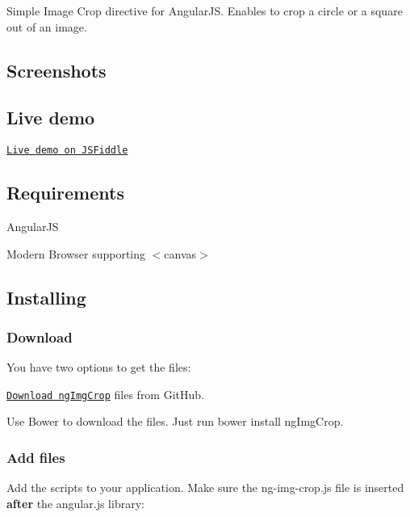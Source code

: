 Simple Image Crop directive for Angular\+JS. Enables to crop a circle or a square out of an image.

\subsection*{Screenshots}





\subsection*{Live demo}

\href{http://jsfiddle.net/alexk111/rw6q9/}{\tt Live demo on J\+S\+Fiddle}

\subsection*{Requirements}


\begin{DoxyItemize}
\item Angular\+JS
\item Modern Browser supporting $<$canvas$>$
\end{DoxyItemize}

\subsection*{Installing}

\subsubsection*{Download}

You have two options to get the files\+:
\begin{DoxyItemize}
\item \href{https://github.com/alexk111/ngImgCrop/archive/master.zip}{\tt Download ng\+Img\+Crop} files from Git\+Hub.
\item Use Bower to download the files. Just run {\ttfamily bower install ng\+Img\+Crop}.
\end{DoxyItemize}

\subsubsection*{Add files}

Add the scripts to your application. Make sure the {\ttfamily ng-\/img-\/crop.\+js} file is inserted {\bfseries after} the {\ttfamily angular.\+js} library\+:


